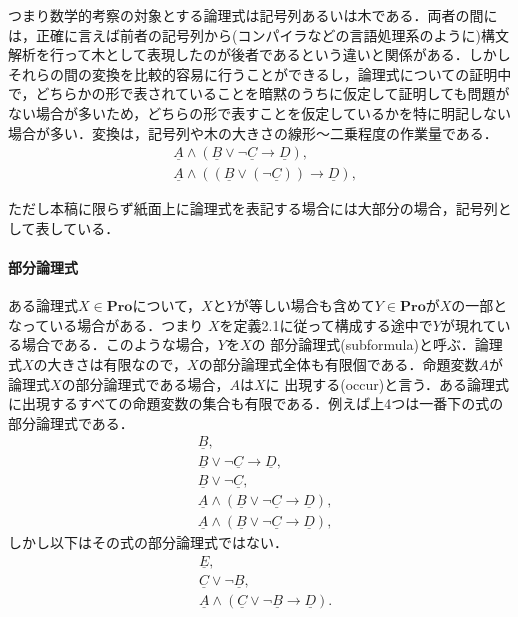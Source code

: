 \documentclass{ltjsarticle}
\theoremstyle{mystyle1}
\theoremstyle{mystyle3}
\theoremstyle{mystyle2}
\newcommand{\uA}{\underline{A}}
\newcommand{\uB}{\underline{B}}
\newcommand{\uC}{\underline{C}}
\newcommand{\uD}{\underline{D}}
\newcommand{\uE}{\underline{E}}
\newcommand{\bPro}{\ensuremath{\mathbf{Pro}}}
\newcommand{\red}[1]{{\color{red} #1}}
\begin{document}
つまり数学的考察の対象とする論理式は記号列あるいは木である．両者の間には，正確に言えば前者の記号列から(コンパイラなどの言語処理系のように)構文解析を行って木として表現したのが後者であるという違いと関係がある．しかしそれらの間の変換を比較的容易に行うことができるし，論理式についての証明中で，どちらかの形で表されていることを暗黙のうちに仮定して証明しても問題がない場合が多いため，どちらの形で表すことを仮定しているかを特に明記しない場合が多い．変換は，記号列や木の大きさの線形～二乗程度の作業量である．
\begin{align}
   & \uA\wedge\left(\uB\vee\neg\uC\to\uD\right),                           \\
   & \uA\wedge\left(\left(\uB\vee\left(\neg\uC\right)\right)\to\uD\right),
\end{align}
\begin{center}
\end{center}


ただし本稿に限らず紙面上に論理式を表記する場合には大部分の場合，記号列として表している．
\paragraph{部分論理式}
ある論理式$X\in \bPro$について，$X$と$Y$が等しい場合も含めて$Y\in\bPro$が$X$の一部となっている場合がある．つまり $X$を定義2.1に従って構成する途中で$Y$が現れている場合である．このような場合，$Y$を$X$の\red{部分論理式}(subformula)と呼ぶ．論理式$X$の大きさは有限なので，$X$の部分論理式全体も有限個である．命題変数$A$が論理式$X$の部分論理式である場合，$A$は$X$に\red{出現する}(occur)と言う．ある論理式に出現するすべての命題変数の集合も有限である．例えば上4つは一番下の式の部分論理式である．
\begin{align}
   & \uB,                                        \\
   & \uB\vee\neg\uC\to\uD,                       \\
   & \uB\vee\neg\uC,                             \\
   & \uA\wedge\left(\uB\vee\neg\uC\to\uD\right), \\
   & \uA\wedge\left(\uB\vee\neg\uC\to\uD\right),
\end{align}
しかし以下はその式の部分論理式ではない．
\begin{align}
   & \uE,                                        \\
   & \uC\vee\neg\uB,                             \\
   & \uA\wedge\left(\uC\vee\neg\uB\to\uD\right).
\end{align}
\end{document}
